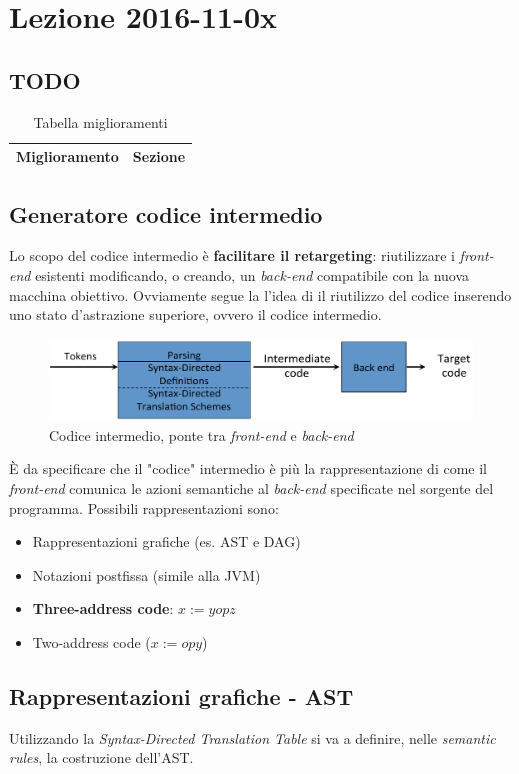 \section{Lezione 2016-11-0x}
\subsection{TODO}
\begin{table}[H]
\begin{center}
\begin{tabular}{|p{\textwidth}|c|}
\hline
\multicolumn{1}{|c|}{\textbf{Miglioramento}} & \textbf{Sezione} \\ \hline
\end{tabular}
\end{center}
\caption{Tabella miglioramenti}
\label{tab:tab_todo}
\end{table}

\subsection{Generatore codice intermedio}
Lo scopo del codice intermedio \`e \textbf{facilitare il retargeting}:
riutilizzare i \textit{front-end} esistenti modificando, o creando, un
\textit{back-end} compatibile con la nuova macchina obiettivo. Ovviamente segue
la l'idea di il riutilizzo del codice inserendo uno stato d'astrazione
superiore, ovvero il codice intermedio.

\begin{figure}[H]
  \includegraphics[scale=0.4]{res/image/compiler_backend}
  \caption{Codice intermedio, ponte tra \textit{front-end} e \textit{back-end}}
  \label{img:compiler_backend}
\end{figure}

\`E da specificare che il "codice" intermedio \`e pi\`u la rappresentazione
di come il \textit{front-end} comunica le azioni semantiche al
\textit{back-end} specificate nel sorgente del programma. Possibili
rappresentazioni sono:
\begin{itemize}
\item Rappresentazioni grafiche (es. AST e DAG)
\item Notazioni postfissa (simile alla JVM)
\item \textbf{Three-address code}: $x := y op z$
\item Two-address code ($x := op y$)
\end{itemize}

\subsection{Rappresentazioni grafiche - AST}
Utilizzando la \textit{Syntax-Directed Translation Table} si va a definire,
nelle \textit{semantic rules}, la costruzione dell'AST.
